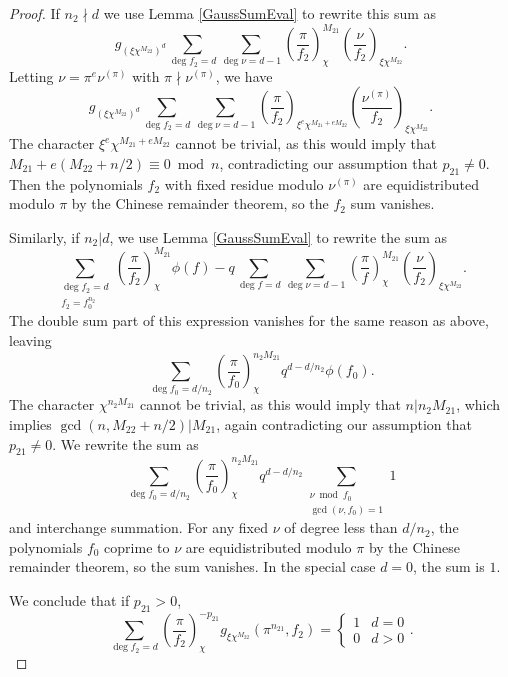 \documentclass[11pt,letterpaper]{article}
\theoremstyle{definition}
\theoremstyle{remark}
\numberwithin{equation}{section}
\theoremstyle{dotless}
\newcommand{\res}[2]{\left(\frac{#1}{#2}\right)}
\begin{document}
\begin{proof}
If $n_2 \nmid d$ we use Lemma \ref{GaussSumEval} to rewrite this sum as
\begin{equation*}
g_{(\xi \chi^{M_{22}})^d} \sum_{\deg f_2=d} \sum_{\deg \nu = d-1} \res{\pi}{f_2}_{\chi}^{M_{21}} \res{\nu}{f_2}_{\xi \chi^{M_{22}}}.
\end{equation*}
Letting $\nu=\pi^e \nu^{(\pi)}$ with $\pi \nmid \nu^{(\pi)}$, we have
\begin{equation*}
g_{(\xi \chi^{M_{22}})^d} \sum_{\deg f_2=d} \sum_{\deg \nu = d-1} \res{\pi}{f_2}_{\xi^e \chi^{M_{21}+eM_{22}}} \res{\nu^{(\pi)}}{f_2}_{\xi \chi^{M_{22}}}.
\end{equation*}
The character $\xi^e \chi^{M_{21}+e M_{22}}$ cannot be trivial, as this would imply that $ M_{21} +e(M_{22}+n/2) \equiv 0 \bmod n$, contradicting our assumption that $p_{21} \neq 0$. Then the polynomials $f_2$ with fixed residue modulo $\nu^{(\pi)}$ are equidistributed modulo $\pi$ by the Chinese remainder theorem, so the $f_2$ sum vanishes.

Similarly, if $n_2|d$, we use Lemma \ref{GaussSumEval} to rewrite the sum as 
\begin{equation*} 
\sum_{\substack{\deg f_2 = d \\ f_2=f_0^{n_2}}} \res{\pi}{f_2}_{\chi}^{M_{21}} \phi(f) - q \sum_{\deg f = d} \sum_{\deg \nu = d-1} \res{\pi}{f}_{\chi}^{M_{21}} \res{\nu}{f_2}_{\xi \chi^{M_{22}}}.
\end{equation*}
The double sum part of this expression vanishes for the same reason as above, leaving
\begin{equation*} 
\sum_{\deg f_0 = d/n_2} \res{\pi}{f_0}_{\chi}^{n_2 M_{21}} q^{d-d/n_2} \phi(f_0).
\end{equation*}
The character $\chi^{n_2 M_{21}}$ cannot be trivial, as this would imply that $n | n_2 M_{21}$, which implies $\gcd(n, M_{22}+n/2)|M_{21}$, again contradicting our assumption that $p_{21} \neq 0$. We rewrite the sum as
\begin{equation*} 
\sum_{\deg f_0 = d/n_2} \res{\pi}{f_0}_{\chi}^{n_2 M_{21}} q^{d-d/n_2} \sum_{\substack{\nu \bmod f_0 \\ \gcd(\nu, f_0)=1}} 1
\end{equation*}
and interchange summation. For any fixed $\nu$ of degree less than $d/n_2$, the polynomials $f_0$ coprime to $\nu$ are equidistributed modulo $\pi$ by the Chinese remainder theorem, so the sum vanishes. In the special case $d=0$, the sum is $1$.

We conclude that if $p_{21}>0$,
\begin{equation*} 
\sum_{\deg f_2=d} \res{\pi}{f_2}_{\chi}^{-p_{21}} g_{\xi \chi^{M_{22}}}(\pi^{n_{21}}, f_2) = \left\lbrace \begin{array}{cc} 1 & d=0 \\ 0 & d>0 \end{array}\right. .
\end{equation*}


\end{proof}
\end{document}

